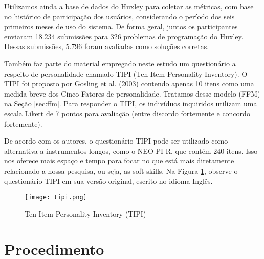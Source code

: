 Utilizamos ainda a base de dados do Huxley para coletar as métricas, com base no histórico de participação dos usuários, considerando o período dos seis primeiros meses de uso do sistema. De forma geral, juntos os participantes enviaram 18.234 submissões para 326 problemas de programação do Huxley. Dessas submissões, 5.796 foram avaliadas como soluções corretas.


Também faz parte do material empregado neste estudo um questionário a respeito de personalidade chamado TIPI (Ten-Item Personality Inventory).
O TIPI foi proposto por Gosling et al. (2003)\nocite{gosling:03}
contendo apenas 10 itens como uma medida breve dos Cinco Fatores de personalidade.
Tratamos desse modelo (FFM) na Seção \ref{sec:ffm}. Para responder o TIPI, os indivíduos inquiridos utilizam uma escala Likert de 7 pontos para avaliação (entre discordo fortemente e concordo fortemente).

De acordo com os autores, o questionário TIPI pode ser utilizado como alternativa a instrumentos longos, como o NEO PI-R, que contém 240 itens. Isso nos oferece mais espaço e tempo para focar no que está mais diretamente relacionado a nossa pesquisa, ou seja, as soft skills. Na Figura \ref{fig:tipi}, observe o questionário TIPI em sua versão original, escrito no idioma Inglês.

\begin{figure}[ht]
\centering
\caption{\small Ten-Item Personality Inventory (TIPI)}
\texttt{[image: tipi.png]}
\label{fig:tipi}
\end{figure}

\section{Procedimento}
\label{sec:procedimento}

